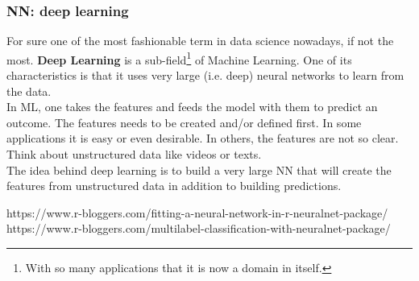 \begin{frame}
\frametitle{NN: deep learning}
For sure one of the most fashionable term in data science nowadays, if not the most. {\bf Deep Learning} is a sub-field\footnote{With so many applications that it is now a domain in itself.} of Machine Learning. One of its characteristics is that it uses very large (i.e. deep) neural networks to learn from the data. \\
\vspace{0.2cm}
In ML, one takes the features and feeds the model with them to predict an outcome. The features needs to be created and/or defined first. In some applications it is easy or even desirable. In others, the features are not so clear. Think about unstructured data like videos or texts.\\
\vspace{0.2cm}
The idea behind deep learning is to build a very large NN that will create the features from unstructured data in addition to building predictions.
\end{frame}
https://www.r-bloggers.com/fitting-a-neural-network-in-r-neuralnet-package/
https://www.r-bloggers.com/multilabel-classification-with-neuralnet-package/
